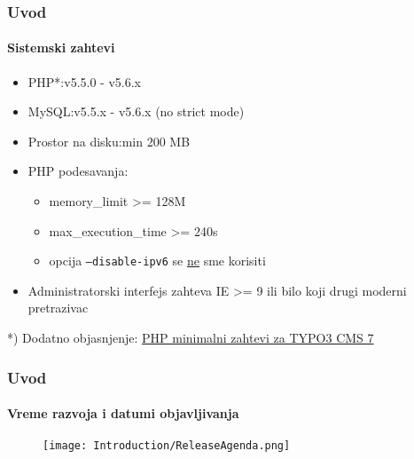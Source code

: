 
\begin{frame}[fragile]
	\frametitle{Uvod}
	\framesubtitle{Sistemski zahtevi}

	\begin{itemize}
		\item PHP*:\tabto{3cm}v5.5.0 - v5.6.x
		\item MySQL:\tabto{3cm}v5.5.x - v5.6.x (no strict mode)
		\item Prostor na disku:\tabto{3cm}min 200 MB
		\item PHP podesavanja:

			\begin{itemize}
				\item memory\_limit >= 128M
				\item max\_execution\_time >= 240s
				\item opcija \texttt{--disable-ipv6} se \underline{ne} sme korisiti
			\end{itemize}

		\item Administratorski interfejs zahteva IE >= 9 ili bilo koji drugi moderni pretrazivac

	\end{itemize}

	\vspace{0.5cm}
	*) Dodatno objasnjenje: \href{http://typo3.org/news/article/php-minimum-requirements-for-typo3-cms-7/}{PHP minimalni zahtevi za TYPO3 CMS 7}

\end{frame}


\begin{frame}[fragile]
	\frametitle{Uvod}
	\framesubtitle{Vreme razvoja i datumi objavljivanja}

	\begin{figure}
		\texttt{[image: Introduction/ReleaseAgenda.png]}
	\end{figure}

\end{frame}

